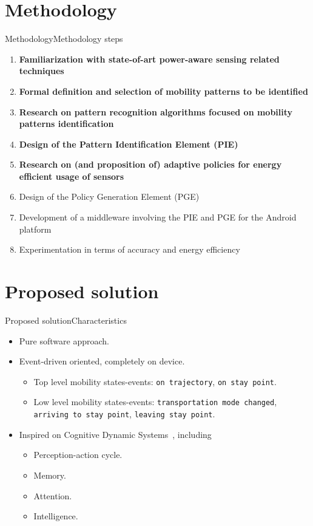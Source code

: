 \documentclass[10pt,xcolor={dvipsnames},handout]{beamer}
\begin{document}
\section{Methodology}
\begin{frame}{Methodology}{Methodology steps}
\begin{enumerate}
  \item \textbf{Familiarization with state-of-art power-aware sensing related techniques}
  \item \textbf{Formal definition and selection of mobility patterns to be identified}
  \item \textbf{Research on pattern recognition algorithms focused on mobility patterns identification}
  \item \textbf{Design of the Pattern Identification Element (PIE)}
  \item \textbf{Research on (and proposition of) adaptive policies for energy efficient usage of sensors}
  \item Design of the Policy Generation Element (PGE)
  \item Development of a middleware involving the PIE and PGE for the Android platform
  \item Experimentation in terms of accuracy and energy efficiency
\end{enumerate}
\end{frame}

\section{Proposed solution}
\begin{frame}{Proposed solution}{Characteristics}
\begin{itemize}
  \item Pure software approach.
  \pause
  \item Event-driven oriented, completely on device.
  \begin{itemize}
    \item Top level mobility states-events: \texttt{on trajectory}, \texttt{on stay point}.
    \pause
    \item Low level mobility states-events: \texttt{transportation mode changed}, \texttt{arriving to stay point}, \texttt{leaving stay point}.
    \pause
  \end{itemize}
  \item Inspired on Cognitive Dynamic Systems~\cite{Haykin2006}, including 
  \begin{itemize}
    \item Perception-action cycle.
    \pause
    \item Memory.
    \pause
    \item Attention.
    \pause
    \item Intelligence.
  \end{itemize}
\end{itemize}
\end{frame}
\end{document}
